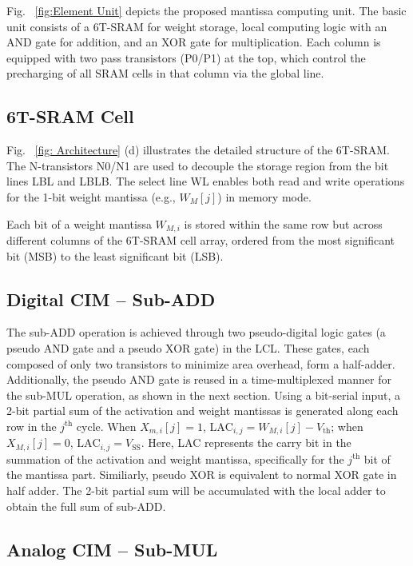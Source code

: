 Fig. \textcolor{blue}{~\ref{fig:Element Unit}} depicts the proposed mantissa computing unit. The basic unit consists of a 6T-SRAM for weight storage, local computing logic with an AND gate for addition, and an XOR gate for multiplication. Each column is equipped with two pass transistors (P0/P1) at the top, which control the precharging of all SRAM cells in that column via the global line.

\subsection{6T-SRAM Cell}
Fig. \textcolor{blue}{~\ref{fig: Architecture}} (d) illustrates the detailed structure of the 6T-SRAM. The N-transistors N0/N1 are used to decouple the storage region from the bit lines LBL and LBLB. The select line WL enables both read and write operations for the 1-bit weight mantissa (e.g., $W_M[j]$) in memory mode.

Each bit of a weight mantissa $W_{M,i}$ is stored within the same row but across different columns of the 6T-SRAM cell array, ordered from the most significant bit (MSB) to the least significant bit (LSB).
\fi

\subsection{Digital CIM -- Sub-ADD}

The sub-ADD operation is achieved through two pseudo-digital logic gates (a pseudo AND gate and a pseudo XOR gate) in the LCL. 
These gates, each composed of only two transistors to minimize area overhead, form a half-adder. 
Additionally, the pseudo AND gate is reused in a time-multiplexed manner for the sub-MUL operation, as shown in the next section. 
Using a bit-serial input, a 2-bit partial sum of the activation and weight mantissas is generated along each row in the $j^{\text{th}}$ cycle. When $X_{m,i}[j] = 1$, $\text{LAC}_{i,j} = W_{M,i}[j] - V_{\text{th}}$; when $X_{M,i}[j] = 0$, $\text{LAC}_{i,j} = V_{\text{SS}}$. 
Here, LAC represents the carry bit in the summation of the activation and weight mantissa, specifically for the $j^{\text{th}}$ bit of the mantissa part.
Similiarly, pseudo XOR is equivalent to normal XOR gate in half adder.
The 2-bit partial sum will be accumulated with the local adder to obtain the full sum of sub-ADD.




\subsection{Analog CIM -- Sub-MUL}


